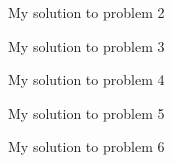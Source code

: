 \documentclass[a4paper,11pt]{article}
\begin{document}
\begin{mlsolution} 

My solution to problem 2


\end{mlsolution}

\begin{mlsolution}

My solution to problem 3

\end{mlsolution}

\begin{mlsolution}

My solution to problem 4

\end{mlsolution}
	
\begin{mlsolution}

My solution to problem 5

\end{mlsolution}

\begin{mlsolution}

My solution to problem 6

\end{mlsolution}
\end{document}
